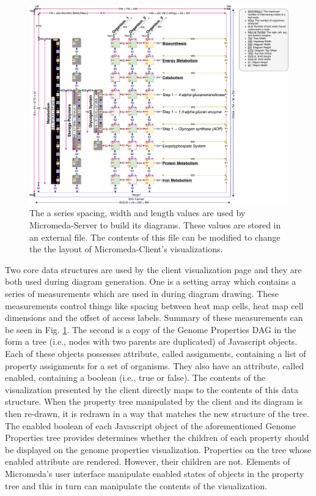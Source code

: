 \begin{figure}[!ht]
  \centering
	\includegraphics[width=\textwidth]{media/diagram_measurements.pdf}
	 \caption{The a series spacing, width and length values are used by Micromeda-Server to build its diagrams. These values are stored in an external file. The contents of this file can be modified to change the the layout of Micromeda-Client's visualizations.}
	 \label{fig:visualization-philosphy}
\end{figure}

Two core data structures are used by the client visualization page and they are both used during diagram generation. One is a setting array which contains a series of measurements which are used in during diagram drawing. These measurements control things like spacing between heat map cells, heat map cell dimensions and the offset of access labels. Summary of these measurements can be seen in Fig. \ref{fig:visualization-philosphy}. The second is a copy of the Genome Properties DAG in the form a tree (i.e., nodes with two parents are duplicated) of Javascript objects. Each of these objects possesses attribute, called assignments, containing a list of property assignments for a set of organisms. They also have an attribute, called enabled, containing a boolean (i.e., true or false). The contents of the visualization presented by the client directly maps to the contents of this data structure. When the property tree manipulated by the client and its diagram is then re-drawn, it is redrawn in a way that matches the new structure of the tree. The enabled boolean of each Javascript object of the aforementioned Genome Properties tree provides determines whether the children of each property should be displayed on the genome properties visualization. Properties on the tree whose enabled attribute are rendered. However, their children are not. Elements of Micromeda's user interface manipulate enabled states of objects in the property tree and this in turn can manipulate the contents of the visualization.

